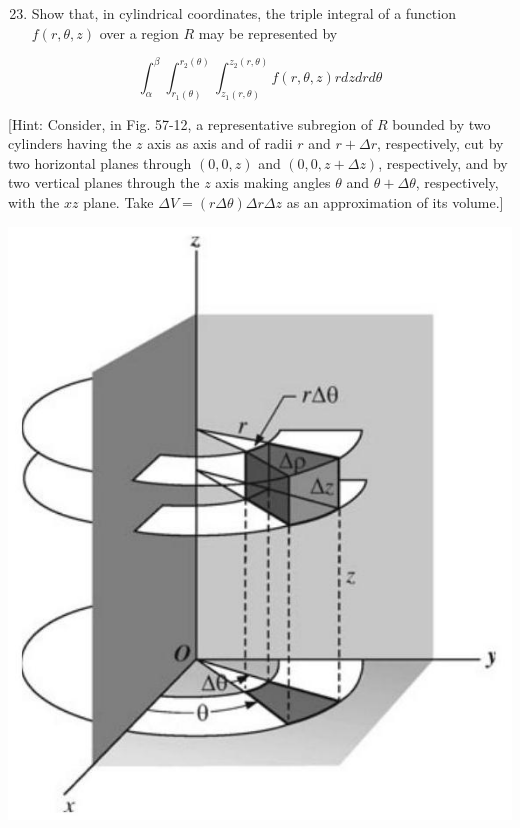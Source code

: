 \documentclass[10pt]{article}
\begin{document}
\begin{enumerate}
  \setcounter{enumi}{22}
  \item Show that, in cylindrical coordinates, the triple integral of a function $f(r, \theta, z)$ over a region $R$ may be represented by
\end{enumerate}

$$
\int_{\alpha}^{\beta} \int_{r_{1}(\theta)}^{r_{2}(\theta)} \int_{z_{1}(r, \theta)}^{z_{2}(r, \theta)} f(r, \theta, z) r d z d r d \theta
$$

[Hint: Consider, in Fig. 57-12, a representative subregion of $R$ bounded by two cylinders having the $z$ axis as axis and of radii $r$ and $r+\Delta r$, respectively, cut by two horizontal planes through $(0,0, z)$ and $(0,0, z+\Delta z)$, respectively, and by two vertical planes through the $z$ axis making angles $\theta$ and $\theta+\Delta \theta$, respectively, with the $x z$ plane. Take $\Delta V=(r \Delta \theta) \Delta r \Delta z$ as an approximation of its volume.]

\begin{center}
\includegraphics[max width=\textwidth]{2024_04_20_fe2e8e718cc0fcd63d1bg-10}
\end{center}
\end{document}
